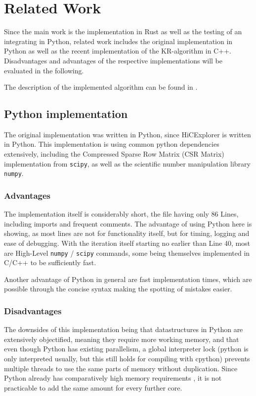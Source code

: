 \chapter{Related Work}\label{chap:relatedwork}

Since the main work is the implementation in Rust as well as the testing of an
integrating in Python, related work includes the original implementation in
Python as well as the recent implementation of the KR-algorithm in C++.
Disadvantages and advantages of the respective implementations will be
evaluated in the following.

The description of the implemented algorithm can be found in .


\section{Python implementation}\label{sec:python}

The original implementation was written in Python, since HiCExplorer is
written in Python. This implementation is using common python dependencies
extensively, including the Compressed Sparse Row Matrix (CSR Matrix)
implementation from \verb|scipy|, as well as the scientific number manipulation
library \verb|numpy|.

\subsection{Advantages}

The implementation itself is considerably short, the file having only 86 Lines,
including imports and frequent comments. The advantage of using Python here is
showing, as most lines are not for functionality itself, but for timing,
logging and ease of debugging. With the iteration itself starting no earlier
than Line 40, most are High-Level \verb|numpy| / \verb|scipy| commands, some
being themselves implemented in C/C++ to be sufficiently fast.

Another advantage of Python in general are fast implementation times, which are
possible through the concise syntax making the spotting of mistakes easier.

\subsection{Disadvantages}

The downsides of this implementation being that datastructures in Python are
extensively objectified, meaning they require more working memory, and that
even though Python has existing parallelism, a global interpreter lock (python
is only interpreted usually, but this still holds for compiling with cpython)
prevents multiple threads to use the same parts of memory without duplication.
Since Python already has comparatively high memory requirements , it is not practicable to add the same amount for every
further core.

